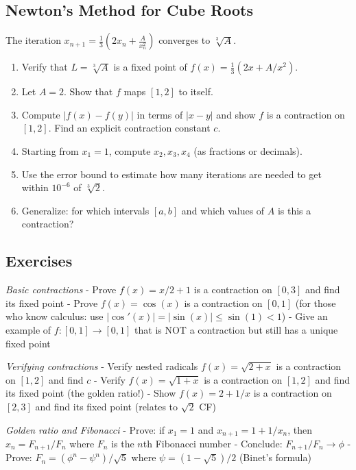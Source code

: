 \documentclass[
  10pt,
  letterpaper,
]{scrbook}
\begin{document}
\subsection{Newton's Method for Cube
Roots}\label{newtons-method-for-cube-roots}

The iteration
\(x_{n+1} = \frac{1}{3}\left(2x_n + \frac{A}{x_n^2}\right)\) converges
to \(\sqrt[3]{A}\).

\begin{enumerate}
\def\labelenumi{(\alph{enumi})}
\item
  Verify that \(L = \sqrt[3]{A}\) is a fixed point of
  \(f(x) = \frac{1}{3}(2x + A/x^2)\).
\item
  Let \(A = 2\). Show that \(f\) maps \([1, 2]\) to itself.
\item
  Compute \(|f(x) - f(y)|\) in terms of \(|x - y|\) and show \(f\) is a
  contraction on \([1, 2]\). Find an explicit contraction constant
  \(c\).
\item
  Starting from \(x_1 = 1\), compute \(x_2, x_3, x_4\) (as fractions or
  decimals).
\item
  Use the error bound to estimate how many iterations are needed to get
  within \(10^{-6}\) of \(\sqrt[3]{2}\).
\item
  Generalize: for which intervals \([a, b]\) and which values of \(A\)
  is this a contraction?
\end{enumerate}

\subsection{Exercises}\label{exercises-17}

\emph{Basic contractions} - Prove \(f(x) = x/2 + 1\) is a contraction on
\([0, 3]\) and find its fixed point - Prove \(f(x) = \cos(x)\) is a
contraction on \([0, 1]\) (for those who know calculus: use
\(|\cos'(x)| = |\sin(x)| \leq \sin(1) < 1\)) - Give an example of
\(f: [0,1] \to [0,1]\) that is NOT a contraction but still has a unique
fixed point

\emph{Verifying contractions} - Verify nested radicals
\(f(x) = \sqrt{2 + x}\) is a contraction on \([1, 2]\) and find \(c\) -
Verify \(f(x) = \sqrt{1 + x}\) is a contraction on \([1, 2]\) and find
its fixed point (the golden ratio!) - Show \(f(x) = 2 + 1/x\) is a
contraction on \([2, 3]\) and find its fixed point (relates to
\(\sqrt{2}\) CF)

\emph{Golden ratio and Fibonacci} - Prove: if \(x_1 = 1\) and
\(x_{n+1} = 1 + 1/x_n\), then \(x_n = F_{n+1}/F_n\) where \(F_n\) is the
\(n\)th Fibonacci number - Conclude: \(F_{n+1}/F_n \to \phi\) - Prove:
\(F_n = (\phi^n - \psi^n)/\sqrt{5}\) where \(\psi = (1 - \sqrt{5})/2\)
(Binet's formula)
\end{document}
